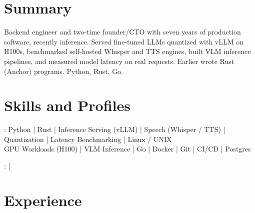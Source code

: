 \documentclass[print]{jack-resume}
\begin{document}
\pagecolor{darkmodeBackground}


\begin{minipage}[t][1cm][t]{.03\textwidth}
    \hfill
\end{minipage}

\section{Summary}
Backend engineer and two-time founder/CTO with seven years of production software, recently inference. Served fine-tuned LLMs quantized with vLLM on H100s, benchmarked self-hosted Whisper and TTS engines, built VLM inference pipelines, and measured model latency on real requests. Earlier wrote Rust (Anchor) programs. Python, Rust, Go.
\sectionsep

\section{Skills and Profiles}
:
Python \hfill | \hfill
Rust \hfill | \hfill
Inference Serving (vLLM) \hfill | \hfill
Speech (Whisper / TTS) \hfill | \hfill
Quantization \hfill | \hfill
Latency Benchmarking \hfill | \hfill
Linux / UNIX \\
\hspace{1.0cm} GPU Workloads (H100) \hfill | \hfill
VLM Inference \hfill | \hfill
Go \hfill | \hfill
Docker \hfill | \hfill
Git \hfill | \hfill
CI/CD \hfill | \hfill
Postgres \\

\raggedright{
    :
      \href{https://www.linkedin.com/in/jack-sturtevant/}{ \ExternalLink} |
     \href{https://github.com/jacksturt}{ \ExternalLink}}

\section{Experience}
\end{document}
